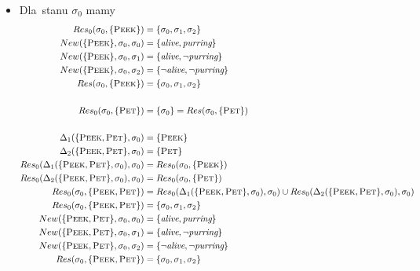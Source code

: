 \documentclass[11pt,a4paper]{article}
\begin{document}
\begin{itemize}
    \item Dla~stanu $\sigma_0$ mamy
    \begin{align*}
        Res_0(\sigma_0, \{ \textsc{Peek} \}) &= \{ \sigma_0, \sigma_1, \sigma_2 \} \\
        New(\{ \textsc{Peek} \}, \sigma_0, \sigma_0) &=  \{ \textit{alive}, \textit{purring} \} \\
        New(\{ \textsc{Peek} \}, \sigma_0, \sigma_1) &=  \{ \textit{alive}, \neg \textit{purring} \} \\
        New(\{ \textsc{Peek} \}, \sigma_0, \sigma_2) &=  \{ \neg \textit{alive}, \neg \textit{purring} \} \\
        Res(\sigma_0, \{ \textsc{Peek} \}) &= \{ \sigma_0, \sigma_1, \sigma_2 \} \\
        \\
        Res_0(\sigma_0, \{ \textsc{Pet} \}) &= \{ \sigma_0 \} = Res(\sigma_0, \{ \textsc{Pet} \}) \\
        \\
        \Delta_1(\{\textsc{Peek},\textsc{Pet}\}, \sigma_0) &= \{\textsc{Peek}\} \\
        \Delta_2(\{\textsc{Peek},\textsc{Pet}\}, \sigma_0) &= \{\textsc{Pet}\} \\
        Res_0(\Delta_1(\{\textsc{Peek},\textsc{Pet}\}, \sigma_0), \sigma_0) &= Res_0(\sigma_0, \{ \textsc{Peek} \}) \\
        Res_0(\Delta_2(\{\textsc{Peek},\textsc{Pet}\}, \sigma_0), \sigma_0) &= Res_0(\sigma_0, \{ \textsc{Pet} \}) \\
        Res_0(\sigma_0, \{\textsc{Peek},\textsc{Pet}\}) &= Res_0(\Delta_1(\{\textsc{Peek},\textsc{Pet}\}, \sigma_0), \sigma_0) \cup Res_0(\Delta_2(\{\textsc{Peek},\textsc{Pet}\}, \sigma_0), \sigma_0) \\
        Res_0(\sigma_0, \{\textsc{Peek},\textsc{Pet}\}) &= \{ \sigma_0, \sigma_1, \sigma_2 \} \\
        New(\{\textsc{Peek},\textsc{Pet}\}, \sigma_0, \sigma_0) &=  \{ \textit{alive}, \textit{purring} \} \\
        New(\{\textsc{Peek},\textsc{Pet}\}, \sigma_0, \sigma_1) &=  \{ \textit{alive}, \neg \textit{purring} \} \\
        New(\{\textsc{Peek},\textsc{Pet}\}, \sigma_0, \sigma_2) &=  \{ \neg \textit{alive}, \neg \textit{purring} \} \\
        Res(\sigma_0, \{\textsc{Peek},\textsc{Pet}\}) &= \{ \sigma_0, \sigma_1, \sigma_2 \}
    \end{align*}
    

\end{itemize}
\end{document}
